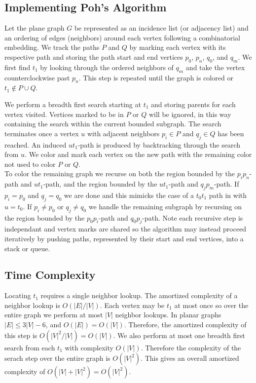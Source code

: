 \documentclass[11pt,letter]{article}
\begin{document}
\subsection*{Implementing Poh's Algorithm}

Let the plane graph $G$ be represented as an incidence list (or adjacency list) and an ordering of edges (neighbors) around
each vertex following a
combinatorial embedding. We track the paths $P$ and $Q$ by marking each vertex with its respective path and
storing the path start and end vertices $p_0$, $p_n$, $q_0$, and $q_m$.
We first find $t_1$ by looking through the ordered neighbors of $q_m$ and take the vertex counterclockwise past
$p_n$. This step is repeated until the graph is colored or $t_1\not\in P\cup Q$.

\noindent We perform a
breadth first search starting at $t_1$ and storing parents for each vertex visited. Vertices marked to be in $P$
or $Q$ will be ignored, in this way containing the search within the current bounded subgraph. The
search terminates once a vertex $u$ with adjacent neighbors $p_i\in P$ and $q_j\in Q$ has been reached. An
induced $ut_1$-path is produced by backtracking through the search from $u$. We color and mark each vertex on the
new path with the remaining color not used to color $P$ or $Q$.\\

\noindent To color the remaining graph we recurse on both the region
bounded by the $p_ip_n$-path and $ut_1$-path, and the region bounded by the $ut_1$-path and $q_jp_m$-path.
If $p_i=p_0$ and $q_j=q_0$ we are done and this mimicks the case of a $t_0t_1$ path in with $u=t_0$.
If $p_i\ne p_0$ or $q_j\ne q_0$ we handle the remaining subgraph by recursing on the region bounded by the
$p_0p_i$-path and $q_0p_j$-path. Note each recursive step is independant and vertex marks are shared so the
algorithm may instead proceed iteratively by pushing paths, represented by their start and end
vertices, into a stack or queue.

\subsection*{Time Complexity}

\noindent Locating $t_1$ requires a single neighbor lookup. The amortized complexity of a neighbor lookup is
$O(|E|/|V|)$. Each vertex may be $t_1$ at most once so over the entire graph we perform at most $|V|$ neighbor
lookups. In planar graphs $|E|\le 3|V|-6$, and $O(|E|)=O(|V|)$. Therefore, the
amortized complexity of this step is $O(|V|^2/|V|)=O(|V|)$. We also perform at most one breadth first
search from each $t_1$ with complexity $O(|V|)$. Therefore the complexity of the serach step over the
entire graph is $O(|V|^2)$. This gives an overall amortized complexity of $O(|V|+|V|^2)=O(|V|^2)$.
\end{document}
